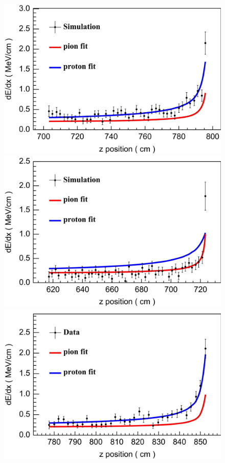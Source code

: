 \begin{itemize}
    \begin{figure}[!htb]
        \centering
        \includegraphics[scale=0.1]{Figures/Chapter4/DataSelection/dedxprotonSim.jpg}
        \includegraphics[scale=0.1]{Figures/Chapter4/DataSelection/dedxpionSim.jpg}
        \includegraphics[scale=0.1]{Figures/Chapter4/DataSelection/dedxprotonData.jpg}

\end{figure}
\end{itemize}
